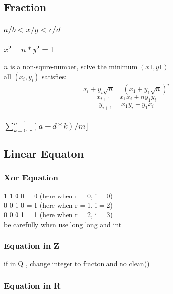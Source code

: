 \documentclass[a4paper,5pt,twocolumn,titlepage]{article}
\begin{document}
\begin{CJK*}{GBK}{song}
    \subsection{Fraction}
        \subsubsection{$a/b < x/y < c/d$}
         
         \subsubsection{$x^2 - n*y^2 = 1$}
         $n$ is a non-squre-number, solve the minimum $(x1,y1)$\\
         all $(x_i,y_i)$ satisfies:
         $$x_i + y_i\sqrt n = (x_1 + y_1\sqrt n)^i$$
         $$x_{i+1} = x_1x_i + ny_1y_i$$
         $$y_{i+1} = x_1y_i + y_1x_i$$
         
         \subsubsection{$\sum_{k=0}^{n-1}\lfloor (a+d*k)/m \rfloor$}
         
    \subsection{Linear Equaton}
        \subsubsection{Xor Equation}
             1 1 0 0 = 0 (here when r = 0, i = 0)\\
             0 0 1 0 = 1 (here when r = 1, i = 2)\\
             0 0 0 1 = 1 (here when r = 2, i = 3)\\
            
            be carefully when use long long and int
            
        \subsubsection{Equation in Z}
        if in Q , change integer to fracton and no clean()
            
        \subsubsection{Equation in R}
            

\end{CJK*}
\end{document}
